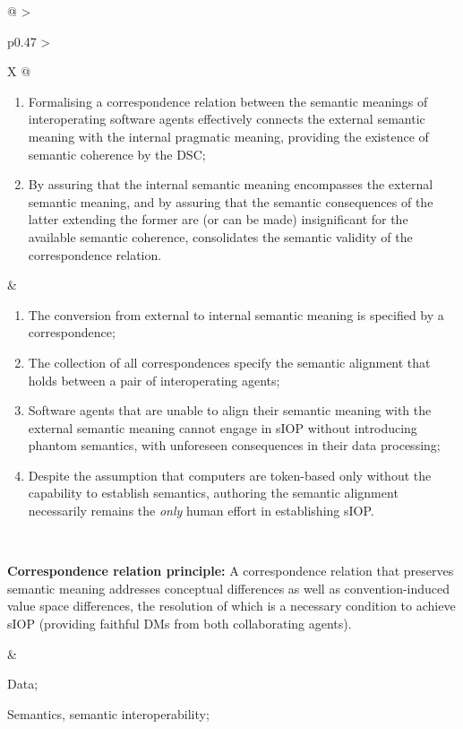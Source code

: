 \begin{xltabular}[l]{\linewidth}{@{} >{\small\raggedright\arraybackslash}p{0.47\linewidth} >{\small\raggedright\arraybackslash}X @{}}
\begin{enumerate}[left=6pt, nosep]
  \item Formalising a correspondence relation between the semantic meanings of interoperating software agents effectively connects the external semantic meaning with the internal pragmatic meaning, providing the existence of semantic coherence by the DSC;
  \item By assuring that the internal semantic meaning encompasses the external semantic meaning, and by assuring that the semantic consequences of the latter extending the former are (or can be made) insignificant for the available semantic coherence, consolidates the semantic validity of the correspondence relation.
\end{enumerate}
&
\begin{enumerate}[left=10pt, nosep]
  \item The conversion from external to internal semantic meaning is specified by a correspondence;
  \item The collection of all correspondences specify the semantic alignment that holds between a pair of interoperating agents;
  \item Software agents that are unable to align their semantic meaning with the external semantic meaning cannot engage in sIOP without introducing phantom semantics, with unforeseen consequences in their data processing;
  \item Despite the assumption that computers are token-based only without the capability to establish semantics, authoring the semantic alignment necessarily remains the \emph{only} human effort in establishing sIOP.
\end{enumerate} \\
%
%
%
\begin{mmdp}\label{dp:alignment-language}{\bfseries Correspondence relation principle:}
\quad A correspondence relation that preserves semantic meaning addresses conceptual differences as well as convention-induced value space differences, the resolution of which is a necessary condition to achieve sIOP (providing faithful DMs from both collaborating agents). \end{mmdp}
&
\begin{description}[labelwidth=3.7cm,leftmargin=3.7cm+1ex,nosep,topsep=2ex,labelsep=1ex,font=\bfseries]
  \item[Type of information:] Data;
  \item[Quality attributes:] Semantics, semantic interoperability;
\end{description}\\

\end{xltabular}
